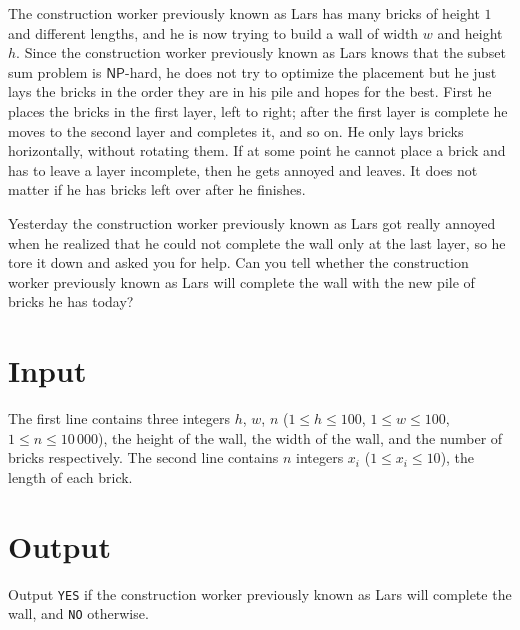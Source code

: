 
The construction worker previously known as Lars has many bricks of
height $1$ and different lengths, and he is now trying to build a wall
of width $w$ and height $h$. Since the construction worker previously
known as Lars knows that the subset sum problem is $\mathsf{NP}$-hard,
he does not try to optimize the placement but he just lays the bricks
in the order they are in his pile and hopes for the best. First he
places the bricks in the first layer, left to right; after the first
layer is complete he moves to the second layer and completes it, and
so on. He only lays bricks horizontally, without rotating them. If at
some point he cannot place a brick and has to leave a layer
incomplete, then he gets annoyed and leaves. It does not matter if he
has bricks left over after he finishes.

Yesterday the construction worker previously known as Lars got really
annoyed when he realized that he could not complete the wall only at
the last layer, so he tore it down and asked you for help. Can you
tell whether the construction worker previously known as Lars will
complete the wall with the new pile of bricks he has today?

\section*{Input}

The first line contains three integers $h$, $w$, $n$
($1 \leq h \leq 100$, $1 \leq w \leq 100$, $1 \leq n \leq 10\,000$), the
height of the wall, the width of the wall, and the number of bricks
respectively. The second line contains $n$ integers $x_i$
($1 \leq x_i \leq 10$), the length of each brick.

\section*{Output}

Output \texttt{YES} if the construction worker previously known as
Lars will complete the wall, and \texttt{NO} otherwise.

